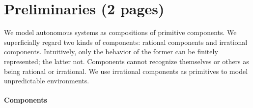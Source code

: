 \section{Preliminaries (2 pages)}


We model autonomous systems as compositions of primitive components.
We superficially regard two kinds of components: rational components and irrational components.
Intuitively, only the behavior of the former can be finitely represented; the latter not.
Components cannot recognize themselves or others as being rational or irrational.
We use irrational components as primitives to model unpredictable environments.

\paragraph{Components}

